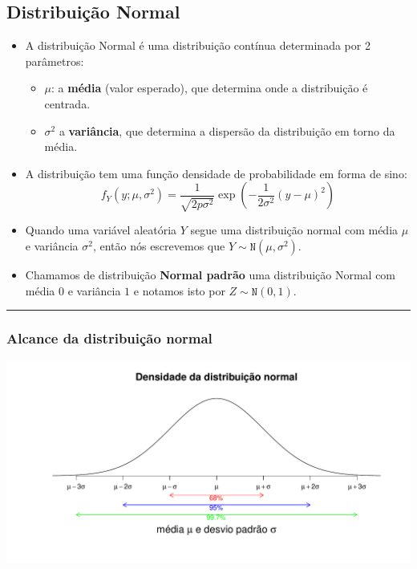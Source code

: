 \documentclass[]{article}
\providecommand{\tightlist}{%
  \setlength{\itemsep}{0pt}\setlength{\parskip}{0pt}}
\begin{document}
\subsection{Distribuição Normal}\label{distribuicao-normal}

\begin{itemize}
\tightlist
\item
  A distribuição Normal é uma distribuição contínua determinada por 2
  parâmetros:

  \begin{itemize}
  \tightlist
  \item
    \(\mu\): a \textbf{média} (valor esperado), que determina onde a
    distribuição é centrada.
  \item
    \(\sigma^2\) a \textbf{variância}, que determina a dispersão da
    distribuição em torno da média.
  \end{itemize}
\item
  A distribuição tem uma função densidade de probabilidade em forma de
  sino:
  \[ f_Y(y;\mu,\sigma^2) = \frac{1}{\sqrt{2p\sigma^2}}\exp \left (-\frac{1}{2\sigma^2}(y-\mu)^2 \right ) \]
\item
  Quando uma variável aleatória \(Y\) segue uma distribuição normal com
  média \(\mu\) e variância \(\sigma^2\), então nós escrevemos que
  \(Y \sim \texttt{N}(\mu,\sigma^2)\).
\item
  Chamamos de distribuição \textbf{Normal padrão} uma distribuição
  Normal com média 0 e variância \(1\) e notamos isto por
  \(Z \sim \texttt{N}(0, 1)\).
\end{itemize}

\begin{center}\rule{0.5\linewidth}{\linethickness}\end{center}

\subsubsection{Alcance da distribuição
normal}\label{alcance-da-distribuicao-normal}

\includegraphics{probability_files/figure-latex/normalreach-1.pdf}
\end{document}
